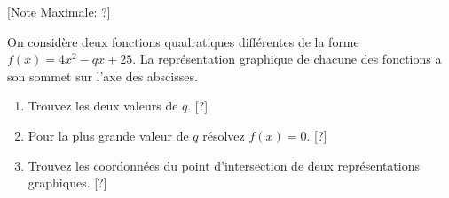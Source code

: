 \begin{question}
  \hspace*{\fill} [Note Maximale: ?]\par
  \noindent On considère deux fonctions quadratiques différentes de la forme $f(x) = 4x^2 - qx + 25$. La représentation graphique de chacune des fonctions a son sommet sur l'axe des abscisses.\par
  \begin{enumerate}[label=(\alph*)]
    \item Trouvez les deux valeurs de $q$.\hspace*{\fill} [?]
    \item Pour la plus grande valeur de $q$ résolvez $f(x) = 0$.\hspace*{\fill} [?]
    \item Trouvez les coordonnées du point d'intersection de deux représentations graphiques.\hspace*{\fill} [?]
  \end{enumerate}
\end{question}

